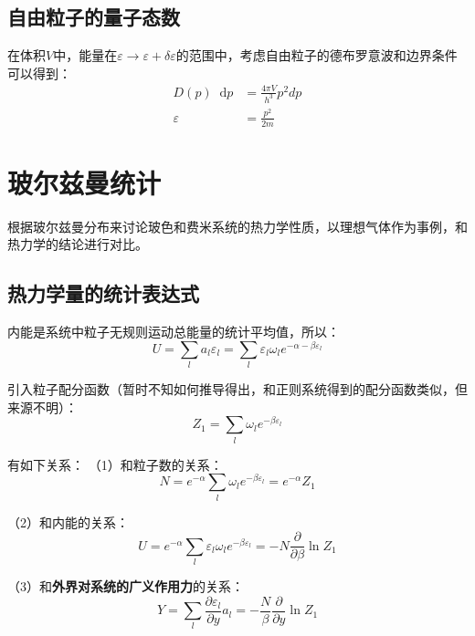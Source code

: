 \documentclass[UTF8]{ctexart}
\newcommand*{\dif}{\mathop{}\!\mathrm{d}}
\begin{document}
	\subsection{自由粒子的量子态数}
	在体积$ V $中，能量在$ \varepsilon \rightarrow \varepsilon+\delta\varepsilon $的范围中，考虑自由粒子的德布罗意波和边界条件可以得到：
	\begin{equation}
	\begin{aligned}
		D(p)\dif p&=\frac{4 \pi V}{h^{3}}p^{2}dp\\
		\varepsilon&=\frac{p^{2}}{2m}
	\end{aligned}
	\end{equation}
	
	\section{玻尔兹曼统计}
	根据玻尔兹曼分布来讨论玻色和费米系统的热力学性质，以理想气体作为事例，和热力学的结论进行对比。
	
	\subsection{热力学量的统计表达式}
	内能是系统中粒子无规则运动总能量的统计平均值，所以：
	\begin{equation}
		U=\sum_{l} a_{l} \varepsilon_{l}= \sum_{l} \varepsilon_{l} \omega_{l} e^{-\alpha-\beta \varepsilon_{l}}
	\end{equation}
	
	引入粒子配分函数（暂时不知如何推导得出，和正则系统得到的配分函数类似，但来源不明）：
	\begin{equation}
		Z_{1}=\sum_{l} \omega_{l} e^{-\beta \varepsilon_{l}}
	\end{equation}
	
	有如下关系：
	（1）和粒子数的关系：
	\begin{equation}
		N=e^{-\alpha}\sum_{l} \omega_{l} e^{-\beta \varepsilon_{l}}=e^{-\alpha}Z_{1}
	\end{equation}
	
	（2）和内能的关系：
	\begin{equation}
		U=e^{-\alpha}\sum_{l} \varepsilon_{l} \omega_{l} e^{-\beta \varepsilon_{l}} = - N \frac{\partial}{\partial \beta} \ln Z_{1} \label{equ_U}
	\end{equation}
	
	（3）和\textbf{外界对系统的广义作用力}的关系：
	\begin{equation}
		Y = \sum_{l} \frac{\partial \varepsilon_{l}}{\partial y} a_{l}=-\frac{N}{\beta} \frac{\partial}{\partial y} \ln Z_{1}\label{equ_Y}
	\end{equation}
	
\end{document}
